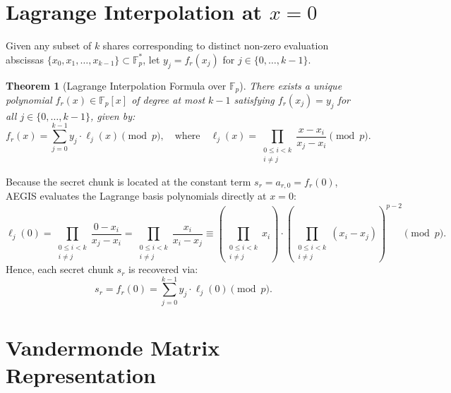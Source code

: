 \documentclass[11pt,a4paper]{article}
\newtheorem{theorem}{Theorem}[section]
\theoremstyle{definition}
\newcommand{\Fp}{\mathbb{F}_p}
\newcommand{\Fps}{\mathbb{F}_p^*}
\begin{document}
\section{Lagrange Interpolation at $x = 0$}

Given any subset of $k$ shares corresponding to distinct non-zero evaluation abscissas $\{x_0, x_1, \dots, x_{k-1}\} \subset \Fps$, let $y_j = f_r(x_j)$ for $j \in \{0, \dots, k-1\}$.

\begin{theorem}[Lagrange Interpolation Formula over $\Fp$]
There exists a unique polynomial $f_r(x) \in \Fp[x]$ of degree at most $k - 1$ satisfying $f_r(x_j) = y_j$ for all $j \in \{0, \dots, k-1\}$, given by:
\begin{equation}
    f_r(x) = \sum_{j=0}^{k-1} y_j \cdot \ell_j(x) \pmod p, \quad \text{where} \quad \ell_j(x) = \prod_{\substack{0 \le i < k \\ i \neq j}} \frac{x - x_i}{x_j - x_i} \pmod p.
\end{equation}
\end{theorem}

Because the secret chunk is located at the constant term $s_r = a_{r,0} = f_r(0)$, AEGIS evaluates the Lagrange basis polynomials directly at $x = 0$:
\begin{equation}
    \ell_j(0) = \prod_{\substack{0 \le i < k \\ i \neq j}} \frac{0 - x_i}{x_j - x_i} = \prod_{\substack{0 \le i < k \\ i \neq j}} \frac{x_i}{x_i - x_j} \equiv \left( \prod_{\substack{0 \le i < k \\ i \neq j}} x_i \right) \cdot \left( \prod_{\substack{0 \le i < k \\ i \neq j}} (x_i - x_j) \right)^{p-2} \pmod p.
\end{equation}
Hence, each secret chunk $s_r$ is recovered via:
\begin{equation}
    s_r = f_r(0) = \sum_{j=0}^{k-1} y_j \cdot \ell_j(0) \pmod p.
\end{equation}

\section{Vandermonde Matrix Representation}
\end{document}
